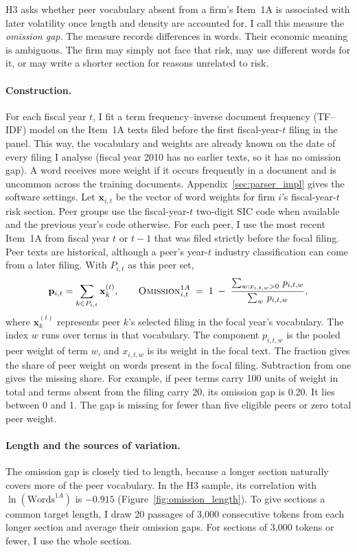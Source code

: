 H3 asks whether peer vocabulary absent from a firm's Item~1A is associated with later volatility once length and density are
accounted for. I call this measure the \emph{omission gap}. The measure records differences in words. Their economic meaning is ambiguous. The
firm may simply not face that risk, may use different words for it, or may
write a shorter section for reasons unrelated to risk.

\paragraph{Construction.} For each fiscal year $t$, I fit a term frequency--inverse document frequency (TF--IDF) model on
the Item~1A texts filed before the first fiscal-year-$t$ filing in the panel.
This way, the vocabulary and weights are already known on the date of every
filing I analyse (fiscal year 2010 has no earlier texts, so it has no omission
gap). A word receives more weight if it occurs frequently in a document and is uncommon across the training documents. Appendix~\ref{sec:parser_impl} gives the software settings. Let $\mathbf{x}_{i,t}$ be the vector of word weights for firm $i$'s fiscal-year-$t$ risk section. Peer groups use the fiscal-year-$t$ two-digit SIC code when available and the previous year's code otherwise. For each peer, I use the
most recent Item~1A from fiscal year $t$ or $t-1$ that was filed strictly
before the focal filing. Peer texts are historical, although a peer's year-$t$ industry classification can come from a later filing. With $P_{i,t}$ as
this peer set,
\begin{equation}
\mathbf{p}_{i,t} = \sum_{k \in P_{i,t}} \mathbf{x}^{(t)}_{k},
\qquad
\textsc{Omission}^{1A}_{i,t} \;=\; 1 \;-\;
  \frac{\sum_{w : x_{i,t,w} > 0}\, p_{i,t,w}}{\sum_{w}\, p_{i,t,w}},
\label{eq:omission}
\end{equation}
where $\mathbf{x}^{(t)}_k$ represents peer $k$'s selected filing in the focal year's vocabulary. The index $w$ runs over terms in that vocabulary. The component $p_{i,t,w}$ is the pooled peer weight of term $w$, and $x_{i,t,w}$ is its weight in the focal text. The fraction gives the share of peer weight on words present in the focal filing. Subtraction from one gives the missing share. For example, if peer terms carry 100 units of weight in total and terms absent from the filing carry 20, its omission gap is 0.20. It lies between 0 and 1. The gap is missing for fewer than five eligible peers or zero total peer weight.

\paragraph{Length and the sources of variation.} The omission gap is closely
tied to length, because a longer section naturally covers more of the peer
vocabulary. In the H3 sample, its correlation with $\ln(\text{Words}^{1A})$ is
$-0.915$ (Figure~\ref{fig:omission_length}). To give sections a common target length, I draw 20 passages of 3{,}000 consecutive tokens from each longer section and average their omission gaps. For sections of 3{,}000 tokens or fewer, I use the whole section.

